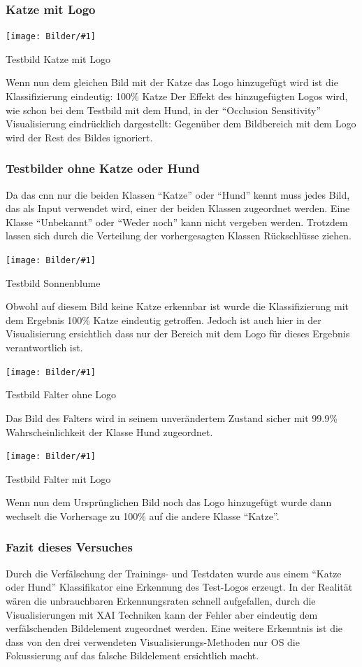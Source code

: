 \documentclass[
  12pt, %
  a4paper, %
  oneside, %
  openany, 
  numbers=noenddot, %
  BCOR=5mm, %
  parskip=half*, %
  thesis, %
]{bfhbook}
\newcommand{\imgText}[3]{
\begin{center}
    \begin{minipage}[t]{0.6\textwidth}
    		\vspace{0pt}
		\texttt{[image: Bilder/\#1]}
		\caption{#2}
	\end{minipage}\hfill
    \begin{minipage}[t]{0.4\textwidth}
    		\vspace{20pt}
  		#3
    \end{minipage}
\end{center}
}
\begin{document}
\subsubsection*{Katze mit Logo}
\imgText{Manipulated_case_img5.png}{Testbild Katze mit Logo}{Wenn nun dem gleichen Bild mit der Katze das Logo hinzugefügt wird ist die Klassifizierung eindeutig: 100\% Katze
\break \break
Der Effekt des hinzugefügten Logos wird, wie schon bei dem Testbild mit dem Hund,  in der ``Occlusion Sensitivity'' Visualisierung eindrücklich dargestellt: Gegenüber dem Bildbereich mit dem Logo wird der Rest des Bildes ignoriert.
}

\subsubsection*{Testbilder ohne Katze oder Hund}
Da das \Gls{cnn} nur die beiden Klassen ``Katze'' oder ``Hund'' kennt muss jedes Bild, das als Input verwendet wird, einer der beiden Klassen zugeordnet werden. Eine Klasse ``Unbekannt'' oder ``Weder noch'' kann nicht vergeben werden. Trotzdem lassen sich durch die Verteilung der vorhergesagten Klassen Rückschlüsse ziehen.
\imgText{Manipulated_case_img1.png}{Testbild Sonnenblume}{
Obwohl auf diesem Bild keine Katze erkennbar ist wurde die Klassifizierung mit dem Ergebnis 100\% Katze eindeutig getroffen. Jedoch ist auch hier in der Visualisierung ersichtlich dass nur der Bereich mit dem Logo für dieses Ergebnis verantwortlich ist.
}
\imgText{Manipulated_case_img2.png}{Testbild Falter ohne Logo}{
Das Bild des Falters wird in seinem unverändertem Zustand sicher mit 99.9\% Wahrscheinlichkeit der Klasse Hund zugeordnet.
}
\imgText{Manipulated_case_img3.png}{Testbild Falter mit Logo}{
Wenn nun dem Ursprünglichen Bild noch das Logo hinzugefügt wurde dann wechselt die Vorhersage zu 100\% auf die andere Klasse ``Katze''.
}

\subsubsection*{Fazit dieses Versuches}
Durch die Verfälschung der Trainings- und Testdaten wurde aus einem ``Katze oder Hund'' Klassifikator eine Erkennung des Test-Logos erzeugt. In der Realität wären die unbrauchbaren Erkennungsraten schnell aufgefallen, durch die Visualisierungen mit \Gls{XAI} Techniken kann der Fehler aber eindeutig dem verfälschenden Bildelement zugeordnet werden.
\break 
Eine weitere Erkenntnis ist die dass von den drei verwendeten Visualisierungs-Methoden nur \Gls{OS} die Fokussierung auf das falsche Bildelement ersichtlich macht. 
\end{document}
